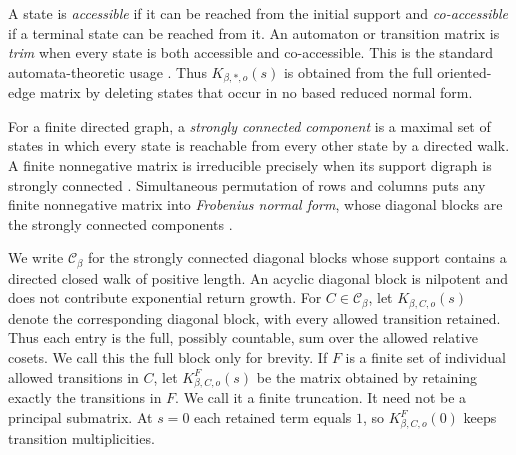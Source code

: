 \documentclass[11pt]{article}
\theoremstyle{definition}
\begin{document}
A state is \emph{accessible} if it can be reached from the initial support and
\emph{co-accessible} if a terminal state can be reached from it.  An automaton or transition
matrix is \emph{trim} when every state is both accessible and co-accessible. This is the
standard automata-theoretic usage
\cite[Definition~1.3.9]{BertheRigo2016}.  Thus $K_{\beta,*,o}(s)$ is obtained from the full
oriented-edge matrix by deleting states that occur in no based reduced normal form.

For a finite directed graph, a \emph{strongly connected component} is a maximal set of
states in which every state is reachable from every other state by a directed walk.  A finite
nonnegative matrix is irreducible precisely when its support digraph is strongly connected
\cite[Theorem~3.2.1]{BrualdiRyser1991}.  Simultaneous permutation of rows and columns puts
any finite nonnegative matrix into \emph{Frobenius normal form}, whose diagonal blocks are
the strongly connected components \cite[Theorem~3.2.4]{BrualdiRyser1991}.

We write $\mathscr C_\beta$ for the strongly connected diagonal blocks whose support contains
a directed closed walk of positive length.  An acyclic diagonal block is nilpotent and does
not contribute exponential return growth.  For $C\in\mathscr C_\beta$, let
$K_{\beta,C,o}(s)$ denote the corresponding diagonal block, with every allowed transition
retained.  Thus each entry is the full, possibly countable, sum over the allowed relative
cosets.  We call this the full block only for brevity.  If $F$ is a finite set of individual
allowed transitions in $C$, let $K^F_{\beta,C,o}(s)$ be the matrix obtained by retaining
exactly the transitions in $F$.  We call it a finite truncation.  It need not be a principal
submatrix.  At $s=0$ each retained term equals $1$, so
$K^F_{\beta,C,o}(0)$ keeps transition multiplicities.
\end{document}
